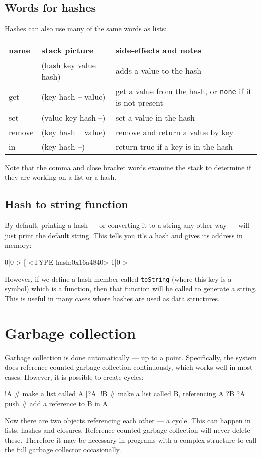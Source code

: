 \subsection{Words for hashes}
Hashes can also use many of the same words as lists:
\begin{center}
\begin{tabular}{|l|l|p{4in}|}\hline
\textbf{name} & \textbf{stack picture} & \textbf{side-effects and notes}\\ \hline
[\%    & (-- hash)    & creates a new hash\\
,    & (hash key value -- hash) & adds a value to the hash\\
]    & (hash key value -- hash) & adds a value to the hash\\
get & (key hash -- value) & get a value from the hash, or \texttt{none} if it is not present\\
set & (value key hash --) & set a value in the hash\\
remove & (key hash -- value) & remove and return a value by key\\
in & (key hash --) & return true if a key is in the hash\\
\hline
\end{tabular}
\end{center}
Note that the comma and close bracket words examine the stack to
determine if they are working on a list or a hash.

\subsection{Hash to string function}
By default, printing a hash --- or converting it to a string any other way ---
will just print the default string. This tells you it's a hash and gives
its address in memory:
\begin{v}
0|0 > [%
<TYPE hash:0x16a4840>
1|0 > 
\end{v}
However, if we define a hash member called \verb+toString+ (where this
key is a symbol) which is a function, then that function will be called
to generate a string. This is useful in many cases where hashes are used
as data structures.

\section{Garbage collection}
Garbage collection is done automatically --- up to a point. Specifically,
the system does reference-counted garbage collection continuously,
which works well in most cases. However, it is possible to
create cycles:
\begin{v}
    [] !A              # make a list called A
    [?A] !B            # make a list called B, referencing A
    ?B ?A push         # add a reference to B in A
\end{v}
Now there are two objects referencing each other --- a cycle. This can
happen in lists, hashes and closures. Reference-counted garbage
collection will never delete these. Therefore it may be necessary
in programs with a complex structure to call the full garbage collector
occasionally.

